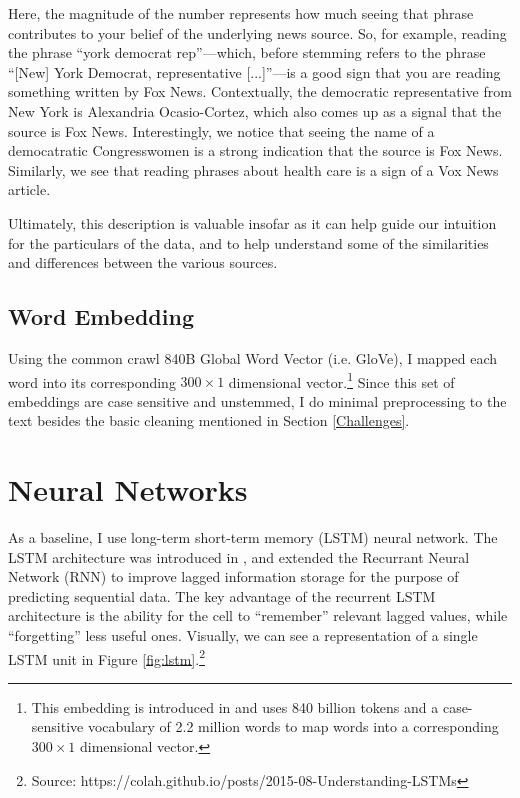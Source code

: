 \documentclass{article}
\begin{document}
		Here, the magnitude of the number represents how much seeing that phrase contributes to your belief of the underlying news source. So, for example, reading the phrase ``york democrat rep''---which, before stemming refers to the phrase ``[New] York Democrat, representative [...]''---is a good sign that you are reading something written by Fox News. Contextually, the democratic representative from New York is Alexandria Ocasio-Cortez, which also comes up as a signal that the source is Fox News. Interestingly, we notice that seeing the name of a democatratic Congresswomen is a  strong indication that the source is Fox News. Similarly, we see that reading phrases about health care is a sign of a Vox News article. 
		
		Ultimately, this description is valuable insofar as it can help guide our intuition for the particulars of the data, and to help understand some of the similarities and differences between the various sources. 
		
		\subsection{Word Embedding}
		Using the common crawl 840B Global Word Vector (i.e. GloVe), I mapped each word into its corresponding $300 \times 1$ dimensional vector.\footnote{This embedding is introduced in \citet{pennington2014glove} and uses 840 billion tokens and a case-sensitive vocabulary of 2.2 million words to map words into a corresponding $300 \times 1$ dimensional vector.} Since this set of embeddings are case sensitive and unstemmed, I do minimal preprocessing to the text besides the basic cleaning mentioned in Section \ref{Challenges}.
	
	    	
	\section{Neural Networks}
	As a baseline, I use long-term short-term memory (LSTM) neural network. The LSTM architecture was introduced in \citet{hochreiter1997long}, and extended the Recurrant Neural Network (RNN) to improve lagged information storage for the purpose of predicting sequential data. The key advantage of the recurrent LSTM architecture is the ability for the cell to ``remember'' relevant lagged values, while ``forgetting'' less useful ones. Visually, we can see a representation of a single LSTM unit in Figure \ref{fig:lstm}.\footnote{Source: https://colah.github.io/posts/2015-08-Understanding-LSTMs}
	
\end{document}
